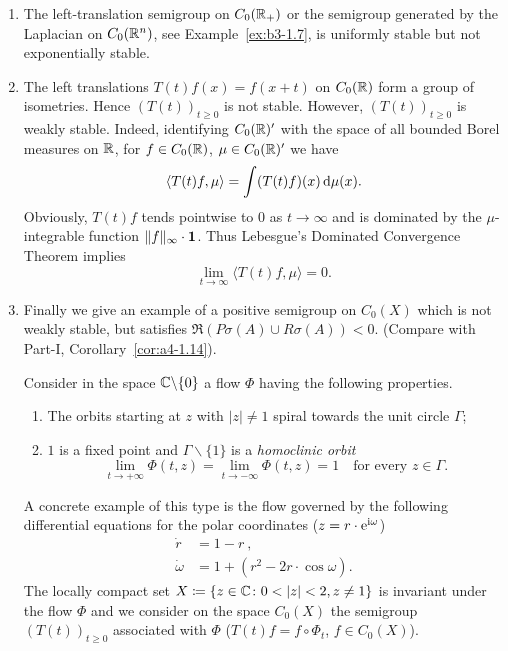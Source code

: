 \begin{example}\label{ex:b4-1.2}
%
%
\begin{enumerate}[\upshape (i), wide, labelindent=.25em]
\item
The left-translation semigroup on $C_{0}(\mathbb{R}_+)$ or the semigroup generated by the Laplacian on $C_{0}(\mathbb{R}^n)$, see Example~\ref{ex:b3-1.7}, is uniformly stable but not exponentially stable.

\item 
The left translations $T(t)f(x) = f(x+t)$ on $C_{0}(\mathbb{R})$ form a group of isometries. 
Hence $(T(t))_{t \geq 0}$ is not stable. 
However, $(T(t))_{t \geq 0}$ is weakly stable. 
Indeed, identifying $C_{0}(\mathbb{R})'$ with the space of all bounded Borel measures on $\mathbb{R}$, for $f \in C_{0}(\mathbb{R})$, $\mu \in C_{0}(\mathbb{R})'$ we have
\[
   \langle T(t)f,\mu \rangle = \int (T(t)f)(x) \mathop{}\!\mathrm{d}{\mu}(x) .
\]
Obviously, $T(t)f$ tends pointwise to $0$ as $t \to \infty$ and is dominated by the $\mu$-integrable function $\|f\|_\infty \cdot \mathbf{1}$. 
Thus Lebesgue's Dominated Convergence Theorem implies
\[ 
\lim_{t\to\infty} \langle T(t)f,\mu \rangle = 0.
\]

\item 
Finally we give an example of a positive semigroup on $C_{0}(X)$ which is not weakly stable, but satisfies $\Re (P\sigma(A) \cup R\sigma(A)) < 0$. (Compare with Part-I, Corollary~\ref{cor:a4-1.14}).

Consider in the space $\mathbb{C}\backslash\{0\}$ a flow $\Phi$ having the following properties.%
\begin{enumerate}[--]
	\item 
	The orbits starting at $z$ with $|z| \neq 1$ spiral towards the unit circle $\Gamma$;
	
	\item 
	$1$ is a fixed point and $\Gamma\backslash\{1\}$ is a \emph{homoclinic orbit} \ie
    \[
    \lim_{t\to+\infty} \Phi(t,z) = \lim_{t\to-\infty} \Phi(t,z) = 1 \quad \text{for every $z \in \Gamma$.}
    \]
\end{enumerate}
A concrete example of this type is the flow governed by the following differential equations for the polar coordinates (\ie $z = r\cdot \mathrm{e}^{\mathrm{i}\omega}$)
\begin{align*}
   \dot{r} &= 1 - r~,\\
   \dot{\omega} &= 1 + (r^2 - 2r\cdot\cos \omega) .
\end{align*}
The locally compact set $X \coloneq
 \{z \in \mathbb{C} \colon 0  <  |z|  <  2, z \neq 1\}$ is invariant under the flow $\Phi$ and we consider on the space $C_{0}(X)$ the semigroup $(T(t))_{t \geq 0}$ associated with $\Phi$ (\ie $T(t)f = f\circ\Phi_t$, $f \in C_{0}(X)$). 
 

\end{enumerate}
\end{example}
